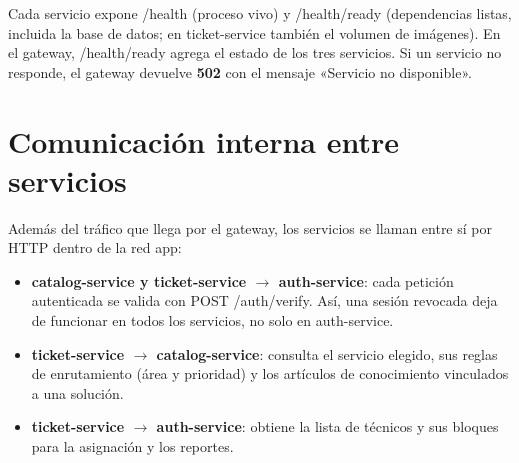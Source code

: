 \documentclass[11pt,a4paper,oneside]{report}
\newcommand{\codus}{\textunderscore\allowbreak}
\DeclareRobustCommand{\cod}[1]{{\small\ttfamily\let\_\codus #1}}
\begin{document}
Cada servicio expone \cod{/health} (proceso vivo) y \cod{/health/ready} (dependencias
listas, incluida la base de datos; en ticket-service también el volumen de imágenes). En el
gateway, \cod{/health/ready} agrega el estado de los tres servicios. Si un servicio no responde,
el gateway devuelve \textbf{502} con el mensaje «Servicio no disponible».

\section{Comunicación interna entre servicios}\label{sec:interna}
Además del tráfico que llega por el gateway, los servicios se llaman entre sí por HTTP dentro
de la red \cod{app}:
\begin{itemize}
  \item \textbf{catalog-service y ticket-service $\rightarrow$ auth-service}: cada petición autenticada se
        valida con \cod{POST /auth/verify}. Así, una sesión revocada deja de funcionar en todos los
        servicios, no solo en auth-service.
  \item \textbf{ticket-service $\rightarrow$ catalog-service}: consulta el servicio elegido, sus reglas de
        enrutamiento (área y prioridad) y los artículos de conocimiento vinculados a una solución.
  \item \textbf{ticket-service $\rightarrow$ auth-service}: obtiene la lista de técnicos y sus bloques para
        la asignación y los reportes.
\end{itemize}
\end{document}

